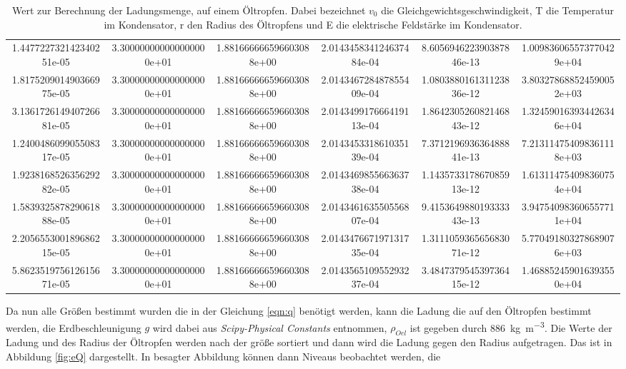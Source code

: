 \begin{table}
{\begin{tabular}{S S[scientific-notation=fixed, fixed-exponent= 0,round-precision=0] S[round-precision=3] S[round-precision = 6]@{$\quad\qquad\pm $} S S}
    1.447722732142340251e-05 & 3.300000000000000000e+01 & 1.881666666596603088e+00 & 2.014345834124637484e-04 & 8.605694622390387846e-13 & 1.009836065573770429e+04\\
    1.817520901490366975e-05 & 3.300000000000000000e+01 & 1.881666666596603088e+00 & 2.014346728487855409e-04 & 1.080388016131123836e-12 & 3.803278688524590052e+03\\
    3.136172614940726681e-05 & 3.300000000000000000e+01 & 1.881666666596603088e+00 & 2.014349917666419113e-04 & 1.864230526082146843e-12 & 1.324590163934426346e+04\\
    1.240048609905508317e-05 & 3.300000000000000000e+01 & 1.881666666596603088e+00 & 2.014345331861035139e-04 & 7.371219693636488841e-13 & 7.213114754098361118e+03\\
    1.923816852635629282e-05 & 3.300000000000000000e+01 & 1.881666666596603088e+00 & 2.014346985566363738e-04 & 1.143573317867085913e-12 & 1.613114754098360754e+04\\
    1.583932587829061888e-05 & 3.300000000000000000e+01 & 1.881666666596603088e+00 & 2.014346163550556807e-04 & 9.415364988019333343e-13 & 3.947540983606557711e+04\\
    2.205655300189686215e-05 & 3.300000000000000000e+01 & 1.881666666596603088e+00 & 2.014347667197131735e-04 & 1.311105936565683071e-12 & 5.770491803278689076e+03\\
    5.862351975612615671e-05 & 3.300000000000000000e+01 & 1.881666666596603088e+00 & 2.014356510955293237e-04 & 3.484737954539736415e-12 & 1.468852459016393550e+04\\
    \bottomrule
  \end{tabular}
}
  \caption{Wert zur Berechnung der Ladungsmenge, auf einem Öltropfen. Dabei
  bezeichnet \texorpdfstring{$v_0$}{math} die Gleichgewichtsgeschwindigkeit, T
  die Temperatur im Kondensator, r den Radius des Öltropfens und E die elektrische
  Feldstärke im Kondensator.}
  \label{tab:mill}
\end{table}
\FloatBarrier
Da nun alle Größen bestimmt wurden die in der Gleichung \eqref{eqn:q} benötigt
werden, kann die Ladung die auf den Öltropfen bestimmt werden, die Erdbeschleunigung
$g$ wird dabei aus \textit{Scipy-Physical Constants} \cite{scipy} entnommen, $\rho_{Oel}$ ist gegeben durch
\SI{886}{\kilo\gram\per\cubic\meter}. Die Werte
der Ladung und des Radius der Öltropfen werden nach der größe sortiert und dann
wird die Ladung gegen den Radius aufgetragen. Das ist in Abbildung \ref{fig:eQ}
dargestellt. In besagter Abbildung können dann Niveaus beobachtet werden, die
